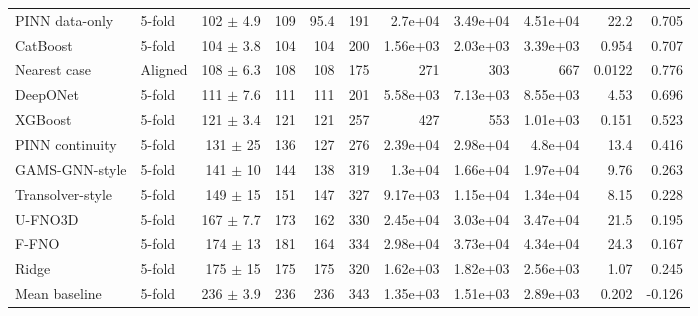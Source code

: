 \begin{landscape}
\begin{longtable}{p{3.4cm}p{1.3cm}rrrrrrrrr}
PINN data-only & 5-fold & 102 $\pm$ 4.9 & 109 & 95.4 & 191 & 2.7e+04 & 3.49e+04 & 4.51e+04 & 22.2 & 0.705 \\
CatBoost & 5-fold & 104 $\pm$ 3.8 & 104 & 104 & 200 & 1.56e+03 & 2.03e+03 & 3.39e+03 & 0.954 & 0.707 \\
Nearest case & Aligned & 108 $\pm$ 6.3 & 108 & 108 & 175 & 271 & 303 & 667 & 0.0122 & 0.776 \\
DeepONet & 5-fold & 111 $\pm$ 7.6 & 111 & 111 & 201 & 5.58e+03 & 7.13e+03 & 8.55e+03 & 4.53 & 0.696 \\
XGBoost & 5-fold & 121 $\pm$ 3.4 & 121 & 121 & 257 & 427 & 553 & 1.01e+03 & 0.151 & 0.523 \\
PINN continuity & 5-fold & 131 $\pm$ 25 & 136 & 127 & 276 & 2.39e+04 & 2.98e+04 & 4.8e+04 & 13.4 & 0.416 \\
GAMS-GNN-style & 5-fold & 141 $\pm$ 10 & 144 & 138 & 319 & 1.3e+04 & 1.66e+04 & 1.97e+04 & 9.76 & 0.263 \\
Transolver-style & 5-fold & 149 $\pm$ 15 & 151 & 147 & 327 & 9.17e+03 & 1.15e+04 & 1.34e+04 & 8.15 & 0.228 \\
U-FNO3D & 5-fold & 167 $\pm$ 7.7 & 173 & 162 & 330 & 2.45e+04 & 3.03e+04 & 3.47e+04 & 21.5 & 0.195 \\
F-FNO & 5-fold & 174 $\pm$ 13 & 181 & 164 & 334 & 2.98e+04 & 3.73e+04 & 4.34e+04 & 24.3 & 0.167 \\
Ridge & 5-fold & 175 $\pm$ 15 & 175 & 175 & 320 & 1.62e+03 & 1.82e+03 & 2.56e+03 & 1.07 & 0.245 \\
Mean baseline & 5-fold & 236 $\pm$ 3.9 & 236 & 236 & 343 & 1.35e+03 & 1.51e+03 & 2.89e+03 & 0.202 & -0.126 \\
\bottomrule\end{longtable}\end{landscape}

